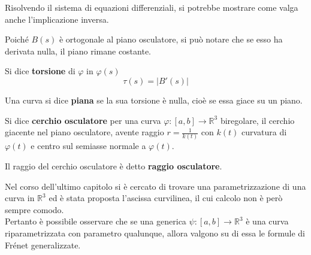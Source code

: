 \begin{oss}
    Risolvendo il sistema di equazioni differenziali, si potrebbe mostrare come valga anche l'implicazione inversa.
\end{oss}
\begin{oss}
    Poiché $B(s)$ è ortogonale al piano osculatore, si può notare che se esso ha derivata nulla, il piano rimane costante.
\end{oss}
\begin{definition}
    Si dice \textbf{torsione} di $\varphi$ in $\varphi(s)$
    \begin{equation*}
        \tau(s)=|B'(s)|
    \end{equation*}
\end{definition}
\begin{definition}
    Una curva si dice \textbf{piana} se la sua torsione è nulla, cioè se essa giace su un piano.
\end{definition}
\begin{definition}
    Si dice \textbf{cerchio osculatore} per una curva $\varphi:[a,b]\to \mathbb{R}^3$ biregolare, il cerchio giacente nel piano osculatore, avente raggio $r=\frac{1}{k(t)}$ con $k(t)$ curvatura di $\varphi(t)$ e centro sul semiasse normale a $\varphi(t)$.
\end{definition}
\begin{definition}
    Il raggio del cerchio osculatore è detto \textbf{raggio osculatore}.
\end{definition}
Nel corso dell'ultimo capitolo si è cercato di trovare una parametrizzazione di una curva in $\mathbb{R}^3$ ed è stata proposta l'ascissa curvilinea, il cui calcolo non è però sempre comodo.\\
Pertanto è possibile osservare che se una generica $\psi:[a,b]\to \mathbb{R}^3$ è una curva riparametrizzata con parametro qualunque, allora valgono su di essa le formule di Frénet generalizzate.
